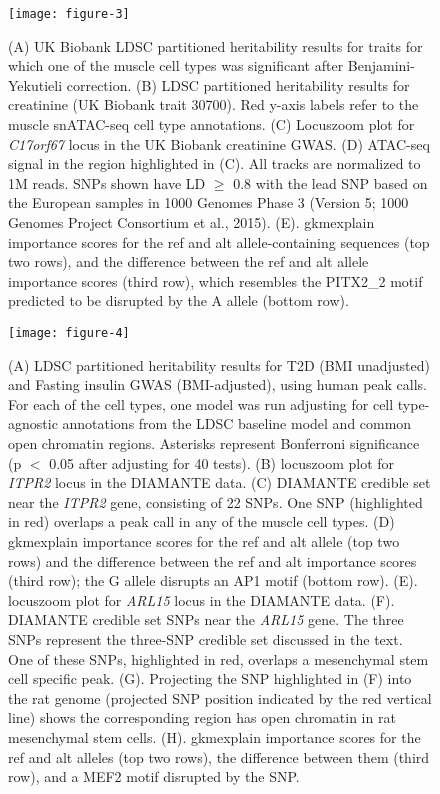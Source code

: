 \documentclass{article}
\begin{document}
\begin{figure}
\texttt{[image: figure-3]}
	\caption{(A) UK Biobank LDSC partitioned heritability results for traits for which one of the muscle cell types was significant after Benjamini-Yekutieli correction. (B) LDSC partitioned heritability results for creatinine (UK Biobank trait 30700). Red y-axis labels refer to the muscle snATAC-seq cell type annotations. (C) Locuszoom plot for \textit{C17orf67} locus in the UK Biobank creatinine GWAS. (D) ATAC-seq signal in the region highlighted in (C). All tracks are normalized to 1M reads. SNPs shown have LD $\ge$ 0.8 with the lead SNP based on the European samples in 1000 Genomes Phase 3 (Version 5; 1000 Genomes Project Consortium et al., 2015). (E). gkmexplain importance scores for the ref and alt allele-containing sequences (top two rows), and the difference between the ref and alt allele importance scores (third row), which resembles the PITX2\_2 motif predicted to be disrupted by the A allele (bottom row).}
\end{figure}

\begin{figure}
\texttt{[image: figure-4]}
	\caption{(A) LDSC partitioned heritability results for T2D (BMI unadjusted) and Fasting insulin GWAS (BMI-adjusted), using human peak calls. For each of the cell types, one model was run adjusting for cell type-agnostic annotations from the LDSC baseline model and common open chromatin regions. Asterisks represent Bonferroni significance (p $<$ 0.05 after adjusting for 40 tests). (B) locuszoom plot for \textit{ITPR2} locus in the DIAMANTE data. (C) DIAMANTE credible set near the \textit{ITPR2} gene, consisting of 22 SNPs. One SNP (highlighted in red) overlaps a peak call in any of the muscle cell types. (D) gkmexplain importance scores for the ref and alt allele (top two rows) and the difference between the ref and alt importance scores (third row); the G allele disrupts an AP1 motif (bottom row). (E). locuszoom plot for \textit{ARL15} locus in the DIAMANTE data. (F). DIAMANTE credible set SNPs near the \textit{ARL15} gene. The three SNPs represent the three-SNP credible set discussed in the text. One of these SNPs, highlighted in red, overlaps a mesenchymal stem cell specific peak. (G). Projecting the SNP highlighted in (F) into the rat genome (projected SNP position indicated by the red vertical line) shows the corresponding region has open chromatin in rat mesenchymal stem cells. (H). gkmexplain importance scores for the ref and alt alleles (top two rows), the difference between them (third row), and a MEF2 motif disrupted by the SNP.}
\end{figure}
\end{document}
